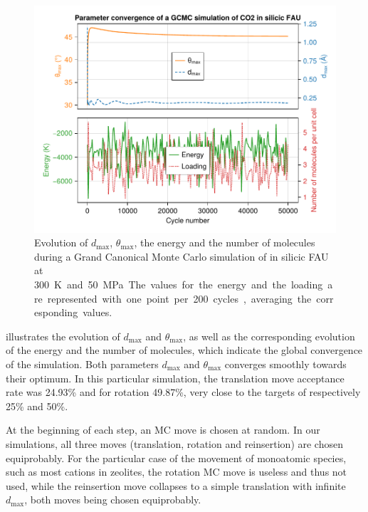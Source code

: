 \documentclass[main.tex]{subfiles}
\begin{document}
\begin{figure}
	\centering
	\includegraphics[width=\linewidth]{figures/gcmc/parameterconvergence.pdf}

	\caption{Evolution of $d_{\max}$, $\theta_{\max}$, the energy and the number of molecules during a Grand Canonical Monte Carlo simulation of  in silicic FAU at \qty{300}K and \qty{50}{MPa}. The values for the energy and the loading are represented with one point per \num{200} cycles, averaging the corresponding values.}\label{fig:parameterconvergence}
\end{figure}

 illustrates the evolution of $d_{\max}$ and $\theta_{\max}$, as well as the corresponding evolution of the energy and the number of molecules, which indicate the global convergence of the simulation. Both parameters $d_{\max}$ and $\theta_{\max}$ converges smoothly towards their optimum. In this particular simulation, the translation move acceptance rate was \num{24.93}\% and for rotation \num{49.87}\%, very close to the targets of respectively \num{25}\% and \num{50}\%.

At the beginning of each step, an MC move is chosen at random. In our simulations, all three moves (translation, rotation and reinsertion) are chosen equiprobably. For the particular case of the movement of monoatomic species, such as most cations in zeolites, the rotation MC move is useless and thus not used, while the reinsertion move collapses to a simple translation with infinite $d_{\max}$, both moves being chosen equiprobably.
\end{document}

